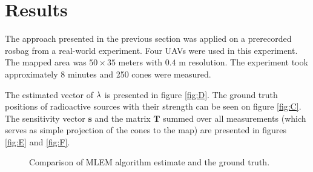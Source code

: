 
\chapter{Results\label{chap:results}}

The approach presented in the previous section was applied on a prerecorded rosbag from a real-world experiment.
Four \ac{UAV}s were used in this experiment.
The mapped area was $50 \times 35$ meters with $0.4$ m resolution.
The experiment took approximately 8 minutes and 250 cones were measured.

The estimated vector of $\bf{\lambda}$ is presented in figure \ref{fig:D}. 
The ground truth positions of radioactive sources with their strength can be seen on figure \ref{fig:C}.
The sensitivity vector $\mathbf{s}$ and the matrix $\mathbf{T}$ summed over all measurements (which serves as simple projection of the cones to the map) are presented in figures \ref{fig:E} and \ref{fig:F}.
\begin{figure}[!h]
  \centering
  \label{fig:A}
  \caption{Comparison of MLEM algorithm estimate and the ground truth.}
\end{figure}

